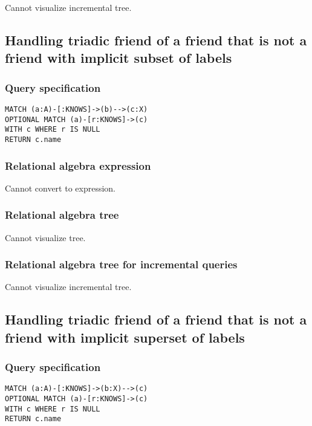 Cannot visualize incremental tree.

\subsection{Handling triadic friend of a friend that is not a friend with implicit subset of labels}

\subsubsection*{Query specification}

\begin{lstlisting}
MATCH (a:A)-[:KNOWS]->(b)-->(c:X)
OPTIONAL MATCH (a)-[r:KNOWS]->(c)
WITH c WHERE r IS NULL
RETURN c.name
\end{lstlisting}

\subsubsection*{Relational algebra expression}

Cannot convert to expression.

\subsubsection*{Relational algebra tree}

Cannot visualize tree.

\subsubsection*{Relational algebra tree for incremental queries}

Cannot visualize incremental tree.

\subsection{Handling triadic friend of a friend that is not a friend with implicit superset of labels}

\subsubsection*{Query specification}

\begin{lstlisting}
MATCH (a:A)-[:KNOWS]->(b:X)-->(c)
OPTIONAL MATCH (a)-[r:KNOWS]->(c)
WITH c WHERE r IS NULL
RETURN c.name
\end{lstlisting}

